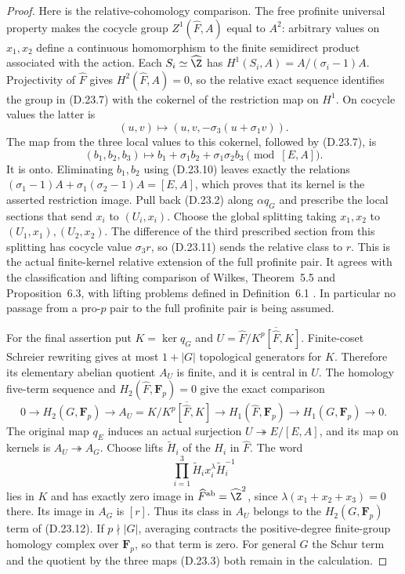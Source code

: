 \begin{proof}
Here is the relative-cohomology comparison.  The free profinite
universal property makes the cocycle group
$Z^1(\widehat F,A)$ equal to $A^2$: arbitrary values on $x_1,x_2$
define a continuous homomorphism to the finite semidirect product
associated with the action.  Each $S_i\simeq\widehat\Z$ has
$H^1(S_i,A)=A/(\sigma_i-1)A$.  Projectivity of $\widehat F$
gives $H^2(\widehat F,A)=0$, so the relative exact sequence
identifies the group in \textup{(D.23.7)} with the cokernel of
the restriction map on $H^1$.  On cocycle values the latter is
\[
 (u,v)\longmapsto
       (u,v,-\sigma_3(u+\sigma_1v)).
 \tag{D.23.10}
\]
The map from the three local values to this cokernel, followed
by \textup{(D.23.7)}, is
\[
 (b_1,b_2,b_3)\longmapsto
       b_1+\sigma_1b_2+\sigma_1\sigma_2b_3\pmod{[E,A]}.
 \tag{D.23.11}
\]
It is onto.  Eliminating $b_1,b_2$ using
\textup{(D.23.10)} leaves exactly the relations
$(\sigma_1-1)A+\sigma_1(\sigma_2-1)A=[E,A]$, which proves
that its kernel is the asserted restriction image.
Pull back \textup{(D.23.2)} along $\alpha q_G$ and prescribe the
local sections that send $x_i$ to $(U_i,x_i)$.  Choose the global
splitting taking $x_1,x_2$ to $(U_1,x_1),(U_2,x_2)$.
The difference of the third prescribed section from this splitting
has cocycle value $\sigma_3r$, so
\textup{(D.23.11)} sends the relative class to $r$.
This is the actual finite-kernel relative extension of the
full profinite pair.  It agrees with the classification and
lifting comparison of Wilkes, Theorem~5.5 and Proposition~6.3,
with lifting problems defined in Definition~6.1
\cite{APeripheralWilkes2025}.  In particular no passage from a
pro-$p$ pair to the full profinite pair is being assumed.

For the final assertion put $K=\ker q_G$ and
$U=\widehat F/\overline{K^p[\widehat F,K]}$.
Finite-coset Schreier rewriting gives at most $1+|G|$ topological
generators for $K$.  Therefore its elementary abelian quotient
$A_U$ is finite, and it is central in $U$.  The homology five-term sequence
and $H_2(\widehat F,\mathbf F_p)=0$ give the exact comparison
\[
 0\longrightarrow H_2(G,\mathbf F_p)\longrightarrow
 A_U=K/\overline{K^p[\widehat F,K]}
 \longrightarrow H_1(\widehat F,\mathbf F_p)
 \longrightarrow H_1(G,\mathbf F_p)\longrightarrow0.
 \tag{D.23.12}
\]
The original map $q_E$ induces an actual surjection
$U\twoheadrightarrow E/[E,A]$, and its map on kernels is
$A_U\twoheadrightarrow A_G$.  Choose lifts $\widetilde H_i$
of the $H_i$ in $\widehat F$.  The word
\[
 \prod_{i=1}^3\widetilde H_i x_i^\lambda
                    \widetilde H_i^{-1}
 \tag{D.23.13}
\]
lies in $K$ and has exactly zero image in
$\widehat F^{\rm ab}=\widehat\Z^2$, since
$\lambda(x_1+x_2+x_3)=0$ there.  Its image in $A_G$ is $[r]$.
Thus its class in $A_U$ belongs to the $H_2(G,\mathbf F_p)$
term of \textup{(D.23.12)}.  If $p\nmid|G|$, averaging contracts
the positive-degree finite-group homology complex over
$\mathbf F_p$, so that term is zero.  For general $G$ the Schur
term and the quotient by the three maps \textup{(D.23.3)} both
remain in the calculation.
\end{proof}

